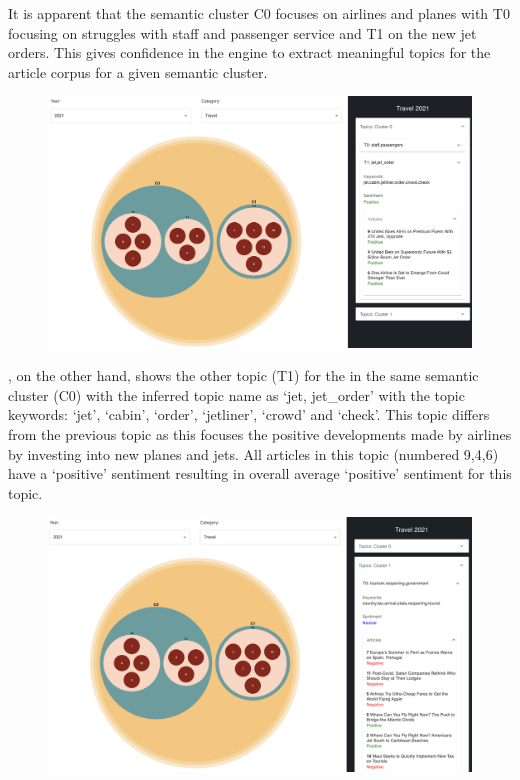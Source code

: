 It is apparent that the semantic cluster C0 focuses on airlines and planes with T0 focusing on struggles with staff and passenger service and T1 on the new jet orders. This gives confidence in the engine to extract meaningful topics for the article corpus for a given semantic cluster. 

\begin{figure}[H]
  \centering
  \includegraphics[width=0.95\linewidth]{images/travel2021_topics_1b.png}
  \caption{}
  \label{fig:topics1b_travel2021}
\end{figure}

, on the other hand, shows the other topic (T1) for the in the same semantic cluster (C0) with the inferred topic name as `jet, jet\_order' with the topic keywords: `jet', `cabin', `order', `jetliner', `crowd' and `check'. This topic differs from the previous topic as this focuses the positive developments made by airlines by investing into new planes and jets. All articles in this topic (numbered 9,4,6) have a `positive' sentiment resulting in overall average `positive' sentiment for this topic.


\begin{figure}[H]
  \centering
  \includegraphics[width=0.95\linewidth]{images/travel2021_topics_2.png}
  \caption{}
  \label{fig:topics2_travel2021}
\end{figure}

